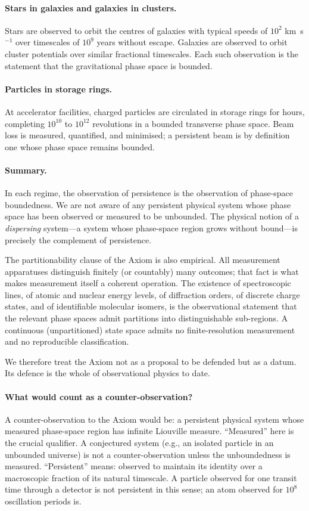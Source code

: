\documentclass[11pt,twocolumn,a4paper]{article}
\theoremstyle{axiomstyle}
\theoremstyle{conseqstyle}
\theoremstyle{definition}
\theoremstyle{remark}
\begin{document}
\paragraph{Stars in galaxies and galaxies in clusters.} Stars are observed to orbit the centres of galaxies with typical speeds of $10^{2}$ km~s$^{-1}$ over timescales of $10^{9}$ years without escape. Galaxies are observed to orbit cluster potentials over similar fractional timescales. Each such observation is the statement that the gravitational phase space is bounded.

\paragraph{Particles in storage rings.} At accelerator facilities, charged particles are circulated in storage rings for hours, completing $10^{10}$ to $10^{12}$ revolutions in a bounded transverse phase space. Beam loss is measured, quantified, and minimised; a persistent beam is by definition one whose phase space remains bounded.

\paragraph{Summary.} In each regime, the observation of persistence is the observation of phase-space boundedness. We are not aware of any persistent physical system whose phase space has been observed or measured to be unbounded. The physical notion of a \emph{dispersing} system---a system whose phase-space region grows without bound---is precisely the complement of persistence.

The partitionability clause of the Axiom is also empirical. All measurement apparatuses distinguish finitely (or countably) many outcomes; that fact is what makes measurement itself a coherent operation. The existence of spectroscopic lines, of atomic and nuclear energy levels, of diffraction orders, of discrete charge states, and of identifiable molecular isomers, is the observational statement that the relevant phase spaces admit partitions into distinguishable sub-regions. A continuous (unpartitioned) state space admits no finite-resolution measurement and no reproducible classification.

We therefore treat the Axiom not as a proposal to be defended but as a datum. Its defence is the whole of observational physics to date.

\paragraph{What would count as a counter-observation?} A counter-observation to the Axiom would be: a persistent physical system whose measured phase-space region has infinite Liouville measure. ``Measured'' here is the crucial qualifier. A conjectured system (e.g., an isolated particle in an unbounded universe) is not a counter-observation unless the unboundedness is measured. ``Persistent'' means: observed to maintain its identity over a macroscopic fraction of its natural timescale. A particle observed for one transit time through a detector is not persistent in this sense; an atom observed for $10^{8}$ oscillation periods is.
\end{document}
